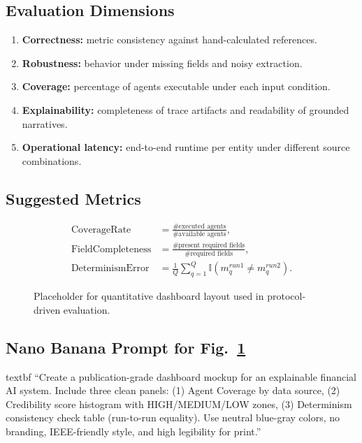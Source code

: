 \documentclass[conference]{IEEEtran}
\begin{document}
\subsection{Evaluation Dimensions}
\begin{enumerate}
    \item \textbf{Correctness:} metric consistency against hand-calculated references.
    \item \textbf{Robustness:} behavior under missing fields and noisy extraction.
    \item \textbf{Coverage:} percentage of agents executable under each input condition.
    \item \textbf{Explainability:} completeness of trace artifacts and readability of grounded narratives.
    \item \textbf{Operational latency:} end-to-end runtime per entity under different source combinations.
\end{enumerate}

\subsection{Suggested Metrics}
\begin{align}
\mathrm{CoverageRate} &= \frac{\#\text{executed agents}}{\#\text{available agents}},\\
\mathrm{FieldCompleteness} &= \frac{\#\text{present required fields}}{\#\text{required fields}},\\
\mathrm{DeterminismError} &= \frac{1}{Q}\sum_{q=1}^{Q}\mathbb{I}(m_q^{run1}\ne m_q^{run2}).
\end{align}

\begin{figure}[t]
\centering
{}
\caption{Placeholder for quantitative dashboard layout used in protocol-driven evaluation.}
\label{fig:eval_placeholder}
\end{figure}

\subsection{Nano Banana Prompt for Fig.~\ref{fig:eval_placeholder}}
\csname textbf ``Create a publication-grade dashboard mockup for an explainable financial AI system. Include three clean panels: (1) Agent Coverage by data source, (2) Credibility score histogram with HIGH/MEDIUM/LOW zones, (3) Determinism consistency check table (run-to-run equality). Use neutral blue-gray colors, no branding, IEEE-friendly style, and high legibility for print.''
\end{document}
